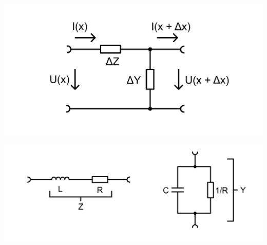 \documentclass[10pt]{article}
\newenvironment{Figure}
  {\par\medskip\noindent\minipage{\linewidth}}
  {\endminipage\par\medskip}
\begin{document}
\begin{multicols}{2}
\begin{Figure}
		\centering
		\includegraphics[width=0.9\linewidth]{Differentierglid.png}
		\label{fig:1.2}
	\end{Figure}
	\begin{Figure}
		\centering
		\includegraphics[width=0.9\linewidth]{Impedanzen.png}
		\label{fig:1.3}
	\end{Figure}


\end{multicols}
\end{document}
